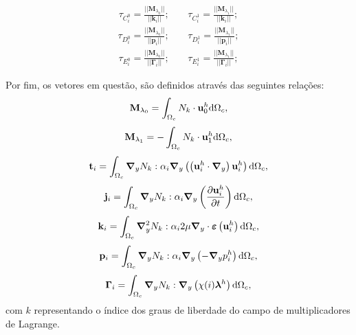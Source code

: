 \begin{align}
	\tau_{C_i^{0}} = \frac{|| \mathbf{M}_{\lambda_0} || }{||\mathbf{k}_{i} ||}; \ \ \ \ \  & \tau_{C_i^{1}} = \frac{|| \mathbf{M}_{\lambda_1} || }{||\mathbf{k}_{i} ||};
\end{align}
\begin{align}
	\tau_{D_i^{0}} = \frac{|| \mathbf{M}_{\lambda_0} || }{||\mathbf{p}_{i} ||}; \ \ \ \ \  & \tau_{D_i^{1}} = \frac{|| \mathbf{M}_{\lambda_1} || }{||\mathbf{p}_{i} ||}; 
\end{align}
\begin{align}
	\tau_{E_i^{0}} = \frac{|| \mathbf{M}_{\lambda_0} || }{||\mathbf{\Gamma}_{i} ||}; \ \ \ \ \  & \tau_{E_i^{1}} = \frac{|| \mathbf{M}_{\lambda_1} || }{||\mathbf{\Gamma}_{i} ||};
\end{align}

Por fim, os vetores em questão, são definidos através das seguintes relações:
\begin{align}
	\mathbf{M}_{\lambda_0} = \int_{\Omega_c} N_{k} \cdot \mathbf{u}_0^h \mathrm{d} \Omega_c,
\end{align}
\begin{align}
	\mathbf{M}_{\lambda_1} = - \int_{\Omega_c} N_{k} \cdot \mathbf{u}_1^h \mathrm{d} \Omega_c,
\end{align}
\begin{align}
	\mathbf{t}_{i} = \int_{\Omega_c} \boldsymbol{\nabla}_y N_{k} : \alpha_i \boldsymbol{\nabla}_y \left( \left( \mathbf{u}_i^{h} \cdot  \boldsymbol{\nabla}_y \right) \mathbf{u}_i^{h} \right)  \mathrm{d} \Omega_c,
\end{align}
\begin{align}
	\mathbf{j}_{i} = \int_{\Omega_c} \boldsymbol{\nabla}_y N_{k} :  \alpha_i \boldsymbol{\nabla}_y \left(\frac{\partial\mathbf{u}_i^{h}}{\partial t}  \right)  \mathrm{d} \Omega_c,
\end{align}
\begin{align}
	\mathbf{k}_{i} = \int_{\Omega_c} \boldsymbol{\nabla}_y^{2} N_{k} : \alpha_i 2 \mu \boldsymbol{\nabla}_y \cdot \bm{\varepsilon} \left(\mathbf{u}_i^{h}\right)    \mathrm{d} \Omega_c,
\end{align}
\begin{align}
	\mathbf{p}_{i} = \int_{\Omega_c} \boldsymbol{\nabla}_y N_{k} : \alpha_i \boldsymbol{\nabla}_y \left(-\boldsymbol{\nabla}_y p_i^{h} \right)    \mathrm{d} \Omega_c,
\end{align}
\begin{align}
	\mathbf{\Gamma}_{i} = \int_{\Omega_c} \boldsymbol{\nabla}_y N_{k} : \boldsymbol{\nabla}_y \left(\chi (i) \boldsymbol{\lambda}^h\right)    \mathrm{d} \Omega_c,
\end{align}
\noindent com $k$ representando o índice dos graus de liberdade do campo de multiplicadores de Lagrange.

